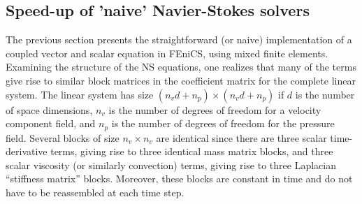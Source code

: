 \subsection{Speed-up of 'naive' Navier-Stokes solvers}
\label{sec:mortensen:speed-up}

The previous section presents the straightforward (or naive)
implementation of a coupled vector and scalar equation in FEniCS, using
mixed finite elements.  Examining the structure of the NS equations, one
realizes that many of the terms give rise to similar block matrices in
the coefficient matrix for the complete linear system. The linear system
has size $(n_vd + n_p) \times (n_vd + n_p)$ if $d$ is the number of space
dimensions, $n_v$ is the number of degrees of freedom for a velocity
component field, and $n_p$ is the number of degrees of freedom for the
pressure field.  Several blocks of size $n_v\times n_v$ are identical
since there are three scalar time-derivative terms, giving rise to three
identical mass matrix blocks, and three scalar viscosity (or similarly
convection) terms, giving rise to three Laplacian ``stiffness matrix''
blocks.  Moreover, these blocks are constant in time and do not have to
be reassembled at each time step.

